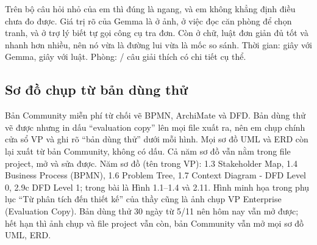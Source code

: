 {Trên bộ câu hỏi nhỏ của em thì đúng là ngang, và em không khẳng định điều chưa đo được. Giá trị rõ của Gemma là ở ảnh, ở việc đọc căn phòng để chọn tranh, và ở trợ lý biết tự gọi công cụ tra đơn. Còn ở chữ, luật đơn giản đủ tốt và nhanh hơn nhiều, nên nó vừa là đường lui vừa là mốc so sánh.}
{Thời gian: \evTextSecGemma{} giây với Gemma, \evTextSecRules{} giây với luật. Phòng: \evRoomConcrete{}/\evRoomPicks{} câu giải thích có chi tiết cụ thể.}

\subsection{Sơ đồ chụp từ bản dùng thử}\label{sec:qtrial}
{Bản Community miễn phí từ chối vẽ BPMN, ArchiMate và DFD. Bản dùng thử vẽ được nhưng in dấu ``evaluation copy'' lên mọi file xuất ra, nên em chụp chính cửa sổ VP và ghi rõ ``bản dùng thử'' dưới mỗi hình. Mọi sơ đồ UML và ERD còn lại xuất từ bản Community, không có dấu. Cả năm sơ đồ vẫn nằm trong file project, mở và sửa được.}
{Năm sơ đồ (tên trong VP): 1.3 Stakeholder Map, 1.4 Business Process (BPMN), 1.6 Problem Tree, 1.7 Context Diagram - DFD Level 0, 2.9c DFD Level 1; trong bài là Hình 1.1--1.4 và 2.11. Hình minh họa trong phụ lục ``Từ phân tích đến thiết kế'' của thầy cũng là ảnh chụp VP Enterprise (Evaluation Copy). Bản dùng thử 30 ngày từ 5/11 nên hôm nay vẫn mở được; hết hạn thì ảnh chụp và file project vẫn còn, bản Community vẫn mở mọi sơ đồ UML, ERD.}
